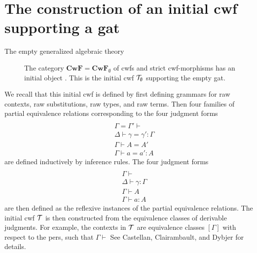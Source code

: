 \documentclass{lmcs}
\newtheorem{theorem}{Theorem}
\def\Cwf{\mathbf{CwF}}
\begin{document}

\section{The construction of an initial cwf supporting a gat}

\begin{description}
\item[The empty generalized algebraic theory] 
The category $\Cwf = \Cwf_\emptyset$ of cwfs and strict cwf-morphisms has an initial object \cite{castellan}. This is the initial cwf ${\mathcal T}_\emptyset$ supporting the empty gat.
\end{description}

We recall that this initial cwf is defined by first defining grammars for raw contexts, raw substitutions, raw types, and raw terms. Then four families of partial equivalence relations corresponding to the four judgment forms
\begin{eqnarray*}
\\&&\Gamma = \Gamma' \vdash
\\&&\Delta \vdash \gamma = \gamma' : \Gamma
\\&&\Gamma \vdash A = A'
\\&&\Gamma \vdash a = a' : A
\end{eqnarray*}
are defined inductively by inference rules. The four judgment forms
\begin{eqnarray*}
\\&&\Gamma \vdash
\\&&\Delta \vdash \gamma : \Gamma
\\&&\Gamma \vdash A
\\&&\Gamma \vdash a : A
\end{eqnarray*}
are then defined as the reflexive instances of the partial equivalence relations. The initial cwf ${\mathcal T}$ is then constructed from the equivalence classes of derivable judgments. For example, the contexts in ${\mathcal T}$ are equivalence classes $[\Gamma]$ with respect to the pers, such that $\Gamma \vdash$ See Castellan, Clairambault, and Dybjer \cite{castellan:warsaw,castellan:lmcs} for details.
\end{document}

